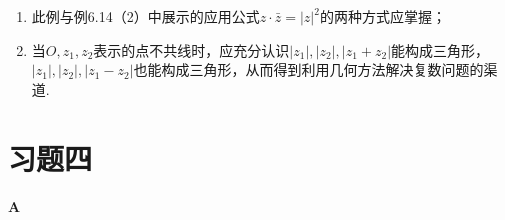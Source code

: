 \begin{remark}
\begin{enumerate}[(1)]
    \item  此例与例6.14（2）中展示的应用公式$z\cdot \bar z=|z|^2$的两种方式应掌握；
    \item 当$O,z_1,z_2$表示的点不共线时，应充分认识$|z_1|,|z_2|,|z_1+z_2|$能构成三角形， $|z_1|,|z_2|,|z_1-z_2|$也能构成三角形，从而得到利用几何方法解决复数问题的渠道.
\end{enumerate}
\end{remark}

\section*{习题四}
\begin{center}
    \bfseries A
\end{center}

